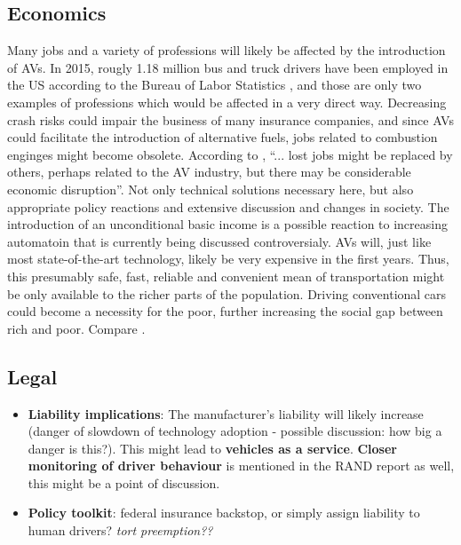 \documentclass[11pt]{article}
\begin{document}
\subsection{Economics}
Many jobs and a variety of professions will likely be affected by the introduction of AVs. In 2015, rougly 1.18 million bus and truck drivers have been employed in the US according to the Bureau of Labor Statistics \cite{USLabourBureau}, and those are only two examples of professions which would be affected in a very direct way. Decreasing crash risks could impair the business of many insurance companies, and since AVs could facilitate the introduction of alternative fuels, jobs related to combustion enginges might become obsolete. According to \cite[p. 40ff]{Anderson2014rand}, ``... lost jobs might be replaced by others, perhaps related to the AV industry, but there may be considerable economic disruption''. Not only technical solutions necessary here, but also appropriate policy reactions and extensive discussion and changes in society. The introduction of an unconditional basic income is a possible reaction to increasing automatoin that is currently being discussed controversialy. 
AVs will, just like most state-of-the-art technology, likely be very expensive in the first years. Thus, this presumably safe, fast, reliable and convenient mean of transportation might be only available to the richer parts of the population. Driving conventional cars could become a necessity for the poor, further increasing the social gap between rich and poor. Compare \cite[p. 39]{Anderson2014rand}.

\subsection{Legal}
\begin{itemize}
\item \textbf{Liability implications}: The manufacturer's liability will likely increase (danger of slowdown of technology adoption - possible discussion: how big a danger is this?). This might lead to \textbf{vehicles as a service}. \textbf{Closer monitoring of driver behaviour} is mentioned in the RAND report as well, this might be a point of discussion.
\item \textbf{Policy toolkit}: federal insurance backstop, or simply assign liability to human drivers? \textit{tort preemption??}
\end{itemize}
\end{document}
